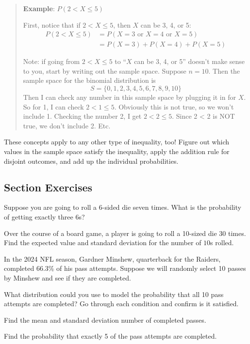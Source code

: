 \documentclass[
]{book}
\begin{document}
\begin{quote}
\textbf{Example}: \(P(2 < X \le 5)\)

First, notice that if \(2 < X \le 5\), then \(X\) can be 3, 4, or 5: \[\begin{aligned} P(2 < X \le 5) &= P(X=3\text{ or }X=4\text{ or }X=5) \\
&= P(X=3)+P(X=4)+P(X=5) \end{aligned}\]

Note: if going from \(2 < X \le 5\) to ``\(X\) can be 3, 4, or 5'' doesn't make sense to you, start by writing out the sample space. Suppose \(n=10\). Then the sample space for the binomial distribution is \[S = \{0, 1, 2, 3, 4, 5, 6, 7, 8, 9, 10\}\] Then I can check any number in this sample space by plugging it in for \(X\). So for 1, I can check \(2 < 1 \le 5\). Obviously this is not true, so we won't include 1. Checking the number 2, I get \(2 < 2 \le 5\). Since 2 \textless{} 2 is NOT true, we don't include 2. Etc.
\end{quote}

These concepts apply to any other type of inequality, too! Figure out which values in the sample space satisfy the inequality, apply the addition rule for disjoint outcomes, and add up the individual probabilities.

\subsection*{Section Exercises}\label{section-exercises-14}

Suppose you are going to roll a 6-sided die seven times. What is the probability of getting exactly three \(6\)s?

Over the course of a board game, a player is going to roll a 10-sized die 30 times. Find the expected value and standard deviation for the number of \(10\)s rolled.

In the 2024 NFL season, Gardner Minshew, quarterback for the Raiders, completed 66.3\% of his pass attempts. Suppose we will randomly select 10 passes by Minshew and see if they are completed.

What distribution could you use to model the probability that all 10 pass attempts are completed? Go through each condition and confirm is it satisfied.

Find the mean and standard deviation number of completed passes.

Find the probability that exactly 5 of the pass attempts are completed.
\end{document}
